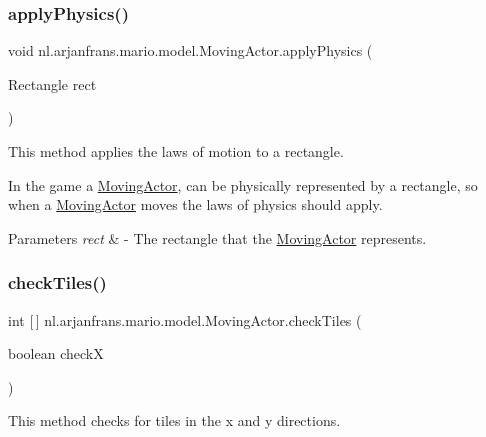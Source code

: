 \subsubsection{\texorpdfstring{apply\+Physics()}{applyPhysics()}}
{\footnotesize\ttfamily void nl.\+arjanfrans.\+mario.\+model.\+Moving\+Actor.\+apply\+Physics (\begin{DoxyParamCaption}\item[{Rectangle}]{rect }\end{DoxyParamCaption})\hspace{0.3cm}{\ttfamily [protected]}}



This method applies the laws of motion to a rectangle. 

In the game a \hyperlink{classnl_1_1arjanfrans_1_1mario_1_1model_1_1MovingActor}{Moving\+Actor}, can be physically represented by a rectangle, so when a \hyperlink{classnl_1_1arjanfrans_1_1mario_1_1model_1_1MovingActor}{Moving\+Actor} moves the laws of physics should apply. 
\begin{DoxyParams}{Parameters}
{\em rect} & -\/ The rectangle that the \hyperlink{classnl_1_1arjanfrans_1_1mario_1_1model_1_1MovingActor}{Moving\+Actor} represents. \\
\hline
\end{DoxyParams}
\mbox{\label{classnl_1_1arjanfrans_1_1mario_1_1model_1_1MovingActor_a782d932e0ff4b3b99de0542892d671c2}} 
\subsubsection{\texorpdfstring{check\+Tiles()}{checkTiles()}}
{\footnotesize\ttfamily int \mbox{[}$\,$\mbox{]} nl.\+arjanfrans.\+mario.\+model.\+Moving\+Actor.\+check\+Tiles (\begin{DoxyParamCaption}\item[{boolean}]{checkX }\end{DoxyParamCaption})\hspace{0.3cm}{\ttfamily [protected]}}



This method checks for tiles in the x and y directions. 


